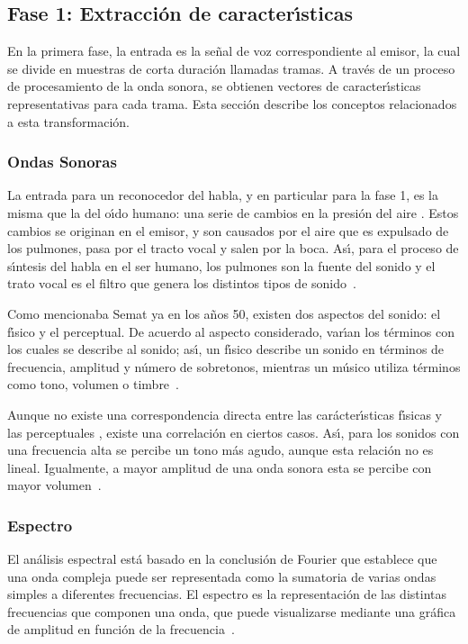 \subsection{Fase 1: Extracci\'on de caracter{\'\i}sticas}
\label{sec:featureExtraction}

En la primera fase, la entrada es la se\~nal de voz correspondiente al emisor, la cual se divide en muestras de corta duraci\'on llamadas tramas. A trav\'es de un proceso de procesamiento de la onda sonora, se obtienen vectores de caracter{\'\i}sticas representativas para cada trama. Esta secci\'on describe los conceptos relacionados a esta transformaci\'on.

\subsubsection{Ondas Sonoras}

La entrada para un reconocedor del habla, y en particular para la fase 1, es la misma que la del o{\'\i}do humano: una serie de cambios en la presi\'on del aire \cite{YoungUniversity2007}. Estos cambios se originan en el emisor, y son causados por el aire que es expulsado de los pulmones, pasa por el tracto vocal y salen por la boca. As{\'\i}, para el proceso de s{\'\i}ntesis del habla en el ser humano, los pulmones son la fuente
del sonido y el trato vocal es el filtro que genera los distintos tipos de \mbox{sonido \cite{BradburyLineal2000}}.

Como mencionaba Semat ya en los a\~nos 50, existen dos aspectos del sonido: el f{\'\i}sico y el perceptual. De acuerdo al aspecto considerado, var{\'\i}an los t\'erminos con los cuales se describe al sonido; as{\'\i}, un f{\'\i}sico describe un sonido en t\'erminos de frecuencia, amplitud y n\'umero de sobretonos, mientras un m\'usico utiliza t\'erminos como tono, volumen o \mbox{timbre \cite{SematPhysics1958}}.

Aunque no existe una correspondencia directa entre las car\'acter{\'\i}sticas f{\'\i}sicas y las perceptuales \cite{SematPhysics1958}, existe una correlaci\'on en ciertos casos. As{\'\i}, para los sonidos con una frecuencia alta se percibe un tono m\'as agudo, aunque esta relaci\'on no es lineal. Igualmente, a mayor amplitud de una onda sonora esta se percibe con mayor \mbox{volumen \cite{YoungUniversity2007}}.

\subsubsection{Espectro}
El an\'alisis espectral est\'a basado en la conclusi\'on de Fourier que establece que una onda compleja puede ser representada como la sumatoria de varias ondas simples a diferentes frecuencias. El espectro es la representaci\'on de las distintas frecuencias que componen una onda, que puede visualizarse mediante una gr\'afica de amplitud en funci\'on de la \mbox{frecuencia \cite{Jurafsky}}. 


